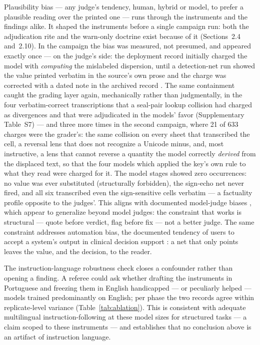 \documentclass[11pt]{article}
\begin{document}
Plausibility bias --- any judge's tendency, human, hybrid or model, to prefer a plausible reading over the printed one --- runs through the instruments and the findings alike. It shaped the instruments before a single campaign run: both the adjudication rite and the warn-only doctrine exist because of it (Sections~2.4 and~2.10). In the campaign the bias was measured, not presumed, and appeared exactly once --- on the judge's side: the deployment record initially charged the model with \emph{computing} the mislabeled dispersion, until a detection-net run showed the value printed verbatim in the source's own prose and the charge was corrected with a dated note in the archived record \citep{barra2026extrai}. The same containment caught the grading layer again, mechanically rather than judgmentally, in the four verbatim-correct transcriptions that a seal-pair lookup collision had charged as divergences and that were adjudicated in the models' favor (Supplementary Table~S7) --- and three more times in the second campaign, where 21 of 633 charges were the grader's: the same collision on every sheet that transcribed the cell, a reversal lens that does not recognize a Unicode minus, and, most instructive, a lens that cannot reverse a quantity the model correctly \emph{derived} from the displaced text, so that the four models which applied the key's own rule to what they read were charged for it. The model stages showed zero occurrences: no value was ever substituted (structurally forbidden), the sign-echo net never fired, and all six transcribed even the sign-sensitive cells verbatim --- a factuality profile opposite to the judges'. This aligns with documented model-judge biases \citep{zheng2023judging}, which appear to generalize beyond model judges: the constraint that works is structural --- quote before verdict, flag before fix --- not a better judge. The same constraint addresses automation bias, the documented tendency of users to accept a system's output in clinical decision support \citep{goddard2012automation}: a net that only points leaves the value, and the decision, to the reader.

The instruction-language robustness check closes a confounder rather than opening a finding. A referee could ask whether drafting the instruments in Portuguese and freezing them in English handicapped --- or peculiarly helped --- models trained predominantly on English; per phase the two records agree within replicate-level variance (Table~\ref{tab:ablation}). This is consistent with adequate multilingual instruction-following at these model sizes for structured tasks --- a claim scoped to these instruments --- and establishes that no conclusion above is an artifact of instruction language.
\end{document}
